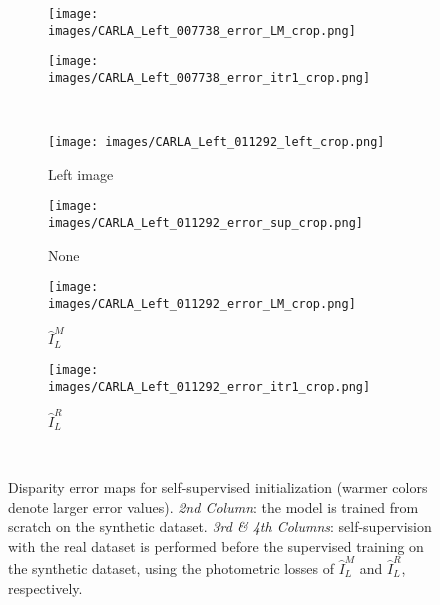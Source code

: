 \documentclass[10pt,twocolumn,letterpaper]{article}
\begin{document}
\begin{figure}[tbp]
	\begin{subfigure}[c]{.242\linewidth}
		\texttt{[image: images/CARLA\_Left\_007738\_error\_LM\_crop.png]}
		\vspace*{-0.38cm}
	\end{subfigure}
	\begin{subfigure}[c]{.242\linewidth}
		\texttt{[image: images/CARLA\_Left\_007738\_error\_itr1\_crop.png]}
		\vspace*{-0.38cm}
	\end{subfigure}	
	\\\begin{subfigure}[c]{.242\linewidth}
		\texttt{[image: images/CARLA\_Left\_011292\_left\_crop.png]}
		\vspace*{-0.45cm}
		\caption{\footnotesize{Left image}}
	\end{subfigure}
	\begin{subfigure}[c]{.242\linewidth}
		\texttt{[image: images/CARLA\_Left\_011292\_error\_sup\_crop.png]}
		\vspace*{-0.45cm}
		\caption{\footnotesize{None}}
	\end{subfigure}
	\begin{subfigure}[c]{.242\linewidth}
		\texttt{[image: images/CARLA\_Left\_011292\_error\_LM\_crop.png]}
		\vspace*{-0.45cm}
		\caption{\footnotesize{$\hat{I}_L^M$}}
	\end{subfigure}
	\begin{subfigure}[c]{.242\linewidth}
		\texttt{[image: images/CARLA\_Left\_011292\_error\_itr1\_crop.png]}
		\vspace*{-0.45cm}
		\caption{\footnotesize{$\hat{I}_L^R$}}
	\end{subfigure}
	\\
	\vspace{-0.3cm}
	\caption{Disparity error maps for self-supervised initialization (warmer colors denote larger error values). \emph{2nd Column}: the model is trained from scratch on the synthetic dataset. \emph{3rd \& 4th Columns}: self-supervision with the real dataset is performed before the supervised training on the synthetic dataset, using the photometric losses of $\hat{I}_L^M$ and $\hat{I}_L^R$, respectively.}
	\label{fig:warpEffect}
\end{figure} 
\end{document}
